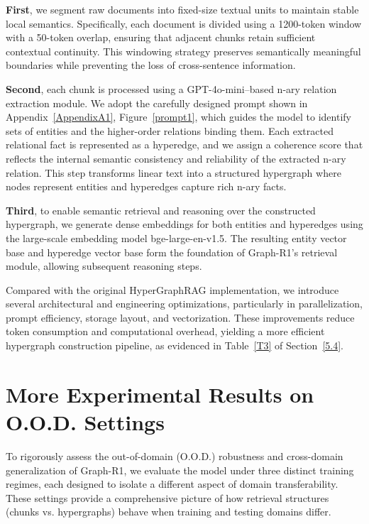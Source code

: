 \documentclass{article}
\theoremstyle{plain}
\theoremstyle{definition}
\theoremstyle{remark}
\begin{document}
\textbf{First}, we segment raw documents into fixed-size textual units to maintain stable local semantics. Specifically, each document is divided using a 1200-token window with a 50-token overlap, ensuring that adjacent chunks retain sufficient contextual continuity. This windowing strategy preserves semantically meaningful boundaries while preventing the loss of cross-sentence information.

\textbf{Second}, each chunk is processed using a GPT-4o-mini–based n-ary relation extraction module. We adopt the carefully designed prompt shown in Appendix~\ref{AppendixA1}, Figure~\ref{prompt1}, which guides the model to identify sets of entities and the higher-order relations binding them. Each extracted relational fact is represented as a hyperedge, and we assign a coherence score that reflects the internal semantic consistency and reliability of the extracted n-ary relation. This step transforms linear text into a structured hypergraph where nodes represent entities and hyperedges capture rich n-ary facts.

\textbf{Third}, to enable semantic retrieval and reasoning over the constructed hypergraph, we generate dense embeddings for both entities and hyperedges using the large-scale embedding model bge-large-en-v1.5. The resulting entity vector base and hyperedge vector base form the foundation of Graph-R1’s retrieval module, allowing subsequent reasoning steps.

Compared with the original HyperGraphRAG implementation, we introduce several architectural and engineering optimizations, particularly in parallelization, prompt efficiency, storage layout, and vectorization. These improvements reduce token consumption and computational overhead, yielding a more efficient hypergraph construction pipeline, as evidenced in Table~\ref{T3} of Section~\ref{5.4}.

\section{More Experimental Results on O.O.D. Settings}

To rigorously assess the out-of-domain (O.O.D.) robustness and cross-domain generalization of Graph-R1, we evaluate the model under three distinct training regimes, each designed to isolate a different aspect of domain transferability. These settings provide a comprehensive picture of how retrieval structures (chunks vs. hypergraphs) behave when training and testing domains differ.
\end{document}
